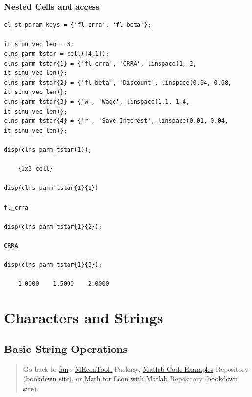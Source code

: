 \documentclass[
]{book}
\begin{document}
\hypertarget{nested-cells-and-access}{%
\subsubsection{Nested Cells and access}\label{nested-cells-and-access}}

\begin{verbatim}
cl_st_param_keys = {'fl_crra', 'fl_beta'};

it_simu_vec_len = 3;
clns_parm_tstar = cell([4,1]);
clns_parm_tstar{1} = {'fl_crra', 'CRRA', linspace(1, 2, it_simu_vec_len)};
clns_parm_tstar{2} = {'fl_beta', 'Discount', linspace(0.94, 0.98, it_simu_vec_len)};
clns_parm_tstar{3} = {'w', 'Wage', linspace(1.1, 1.4, it_simu_vec_len)};
clns_parm_tstar{4} = {'r', 'Save Interest', linspace(0.01, 0.04, it_simu_vec_len)};

disp(clns_parm_tstar(1));

    {1x3 cell}

disp(clns_parm_tstar{1}{1})

fl_crra

disp(clns_parm_tstar{1}{2});

CRRA

disp(clns_parm_tstar{1}{3});

    1.0000    1.5000    2.0000
\end{verbatim}

\hypertarget{characters-and-strings}{%
\section{Characters and Strings}\label{characters-and-strings}}

\hypertarget{basic-string-operations}{%
\subsection{Basic String Operations}\label{basic-string-operations}}

\begin{quote}
Go back to \href{http://fanwangecon.github.io/}{fan}'s \href{https://fanwangecon.github.io/MEconTools/}{MEconTools} Package, \href{https://fanwangecon.github.io/M4Econ/}{Matlab Code Examples} Repository (\href{https://fanwangecon.github.io/M4Econ/bookdown}{bookdown site}), or \href{https://fanwangecon.github.io/Math4Econ/}{Math for Econ with Matlab} Repository (\href{https://fanwangecon.github.io/Math4Econ/bookdown}{bookdown site}).
\end{quote}
\end{document}
